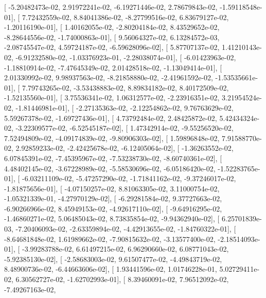 \documentclass{article}
\begin{document}
       [ -5.20482473e-02,   2.91972241e-02,  -6.19271446e-02,
          2.78679843e-02,  -1.59118548e-01],
       [  7.72432559e-02,   8.84041386e-02,  -8.27799516e-02,
          6.83679127e-02,  -1.20116190e-01],
       [  1.40162055e-02,  -2.80204184e-02,   8.43529652e-02,
         -8.28644556e-02,  -1.74000863e-01],
       [  9.56064327e-02,   6.13284572e-03,  -2.08745547e-02,
          4.59724187e-02,  -6.59628096e-02],
       [  5.87707137e-02,   1.41210143e-02,  -6.91232580e-02,
         -1.03376923e-01,  -2.28038074e-01],
       [ -6.01423963e-02,  -1.18810914e-02,  -7.47645349e-02,
          2.01428518e-02,  -1.13049414e-01],
       [  2.01330992e-02,   9.98937563e-02,  -8.21858880e-02,
         -2.41961592e-02,  -1.53535661e-01],
       [  7.79743265e-02,  -3.53438883e-02,   8.89834182e-02,
          8.40172509e-02,  -1.52135560e-01],
       [  3.75536341e-02,   1.06312577e-02,  -2.23916351e-02,
          3.21954524e-02,  -1.81446981e-01],
       [ -2.27135363e-02,  -2.12254862e-02,   9.76763629e-02,
          5.59267378e-02,  -1.69727436e-01],
       [  4.73792484e-02,   2.48425872e-02,   5.42434324e-02,
         -3.22309577e-02,  -6.52545187e-02],
       [  1.47342914e-02,  -9.55256520e-02,   7.52494809e-02,
         -4.09174839e-02,  -9.80906303e-02],
       [  1.59896848e-02,   7.91588770e-02,   2.92859233e-02,
         -2.42425678e-02,  -6.12405064e-02],
       [ -1.36263552e-02,   6.07845391e-02,  -7.45395967e-02,
         -7.53238730e-02,  -8.60740361e-02],
       [  4.48402145e-02,  -3.67228989e-02,  -5.58530696e-02,
         -6.05186420e-02,  -1.52283765e-01],
       [ -6.03211109e-02,  -5.47257290e-02,  -1.71841162e-02,
         -9.37246017e-02,  -1.81875656e-01],
       [ -4.07150257e-02,   8.81063305e-02,   3.11000754e-02,
         -1.05321339e-01,  -4.27970129e-02],
       [ -6.29281584e-02,   9.37727663e-02,  -6.90266966e-02,
          8.45949153e-02,  -4.92617110e-02],
       [ -9.64916295e-02,  -1.46860271e-02,   5.06485043e-02,
          8.73835854e-02,  -9.94362940e-02],
       [  6.25701839e-03,  -7.20406093e-02,  -2.63359894e-02,
         -4.42913655e-02,  -1.84760322e-01],
       [ -8.64681848e-02,   1.61989662e-02,  -7.90815632e-02,
         -3.13577400e-02,  -2.18514093e-01],
       [ -3.99283788e-02,   6.61497215e-02,   6.96290660e-02,
          6.08771043e-02,  -5.92385130e-02],
       [ -2.58683003e-02,   9.61507477e-02,  -4.49843719e-02,
          8.48900736e-02,  -6.44663606e-02],
       [  1.93441596e-02,   1.01746228e-01,   5.02729411e-02,
          6.30562727e-02,  -1.62702993e-01],
       [  8.39460091e-02,   7.96512092e-02,  -7.49267163e-02,
\end{document}
